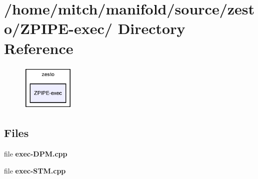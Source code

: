 \section{/home/mitch/manifold/source/zesto/ZPIPE-exec/ Directory Reference}
\label{dir_7a2611989c34d5da73826c22291ea719}


\nopagebreak
\begin{figure}[H]
\begin{center}
\leavevmode
\includegraphics[width=72pt]{dir_7a2611989c34d5da73826c22291ea719_dep}
\end{center}
\end{figure}
\subsection*{Files}
\begin{CompactItemize}
\item 
file {\bf exec-DPM.cpp}
\item 
file {\bf exec-STM.cpp}
\end{CompactItemize}
